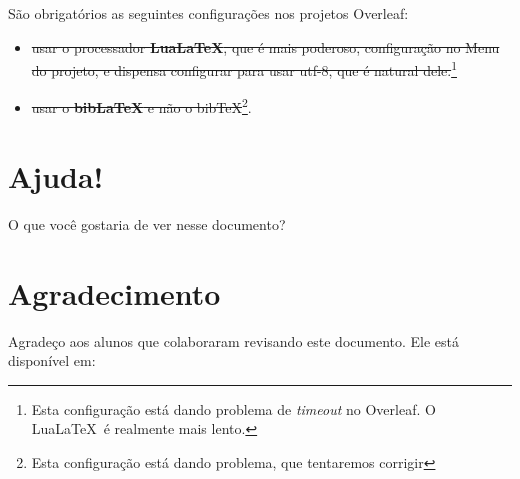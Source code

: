 \documentclass{article}
\begin{document}
     São obrigatórios as seguintes configurações nos projetos Overleaf:
    \begin{itemize}
        \item \sout{usar o processador \textbf{Lua\LaTeX}, que é mais poderoso, configuração no Menu do projeto, e dispensa configurar para usar utf-8, que é natural dele.}\footnote{Esta configuração está dando problema de \textit{timeout} no Overleaf. O Lua\LaTeX\ é realmente mais lento.  }
        \item \sout{usar o \textbf{bibLaTeX} e não o bibTeX}\footnote{ Esta configuração está dando problema, que tentaremos corrigir}.
    
\end{itemize}







\section{Ajuda!}
O que você gostaria de ver nesse documento? 
\section{Agradecimento}
Agradeço aos alunos que colaboraram revisando este documento. Ele está disponível em: 

\printbibliography
\end{document}

